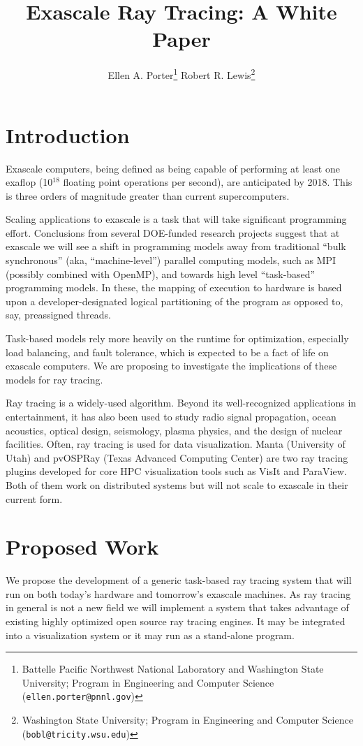 \documentclass[12pt]{article}
\title{Exascale Ray Tracing: A White Paper}
\author{Ellen A. Porter\footnote{
    Battelle Pacific Northwest National Laboratory 
    and Washington State University;
    Program in Engineering and Computer Science
    (\texttt{ellen.porter@pnnl.gov})
  }
\hspace{1in} Robert R. Lewis\footnote{
    Washington State University;
    Program in Engineering and Computer Science
    (\texttt{bobl@tricity.wsu.edu})
  }
}
\begin{document}
\maketitle

\section*{Introduction}

Exascale computers, being defined as being capable of performing at
least one exaflop (10$^{18}$ floating point operations per second),
are anticipated by 2018. This is three orders of magnitude greater
than current supercomputers.

Scaling applications to exascale is a task that will take significant
programming effort. Conclusions from several DOE-funded research
projects suggest that at exascale we will see a shift in programming
models away from traditional ``bulk synchronous'' (aka,
``machine-level'') parallel computing models, such as MPI (possibly
combined with OpenMP), and towards high level ``task-based''
programming models. In these, the mapping of execution to hardware is
based upon a developer-designated logical partitioning of the program
as opposed to, say, preassigned threads.

Task-based models rely more heavily on the runtime for optimization,
especially load balancing, and fault tolerance, which is expected to
be a fact of life on exascale computers. We are proposing to
investigate the implications of these models for ray tracing.

Ray tracing is a widely-used algorithm. Beyond its well-recognized
applications in entertainment, it has also been used to study radio
signal propagation, ocean acoustics, optical design, seismology,
plasma physics, and the design of nuclear facilities. Often, ray
tracing is used for data visualization. 
Manta (University of Utah) and pvOSPRay (Texas Advanced Computing
Center) are two ray tracing plugins developed for core HPC
visualization tools such as VisIt and ParaView.
Both of them work on distributed systems
but will not scale to exascale in their current form.

\section*{Proposed Work}

We propose the development of a generic task-based ray tracing system
that will run on both today's hardware and tomorrow's exascale
machines. As ray tracing in general is not a new field we will
implement a system that takes advantage of existing highly optimized
open source ray tracing engines. It may be integrated into a
visualization system or it may run as a stand-alone program.
\end{document}
